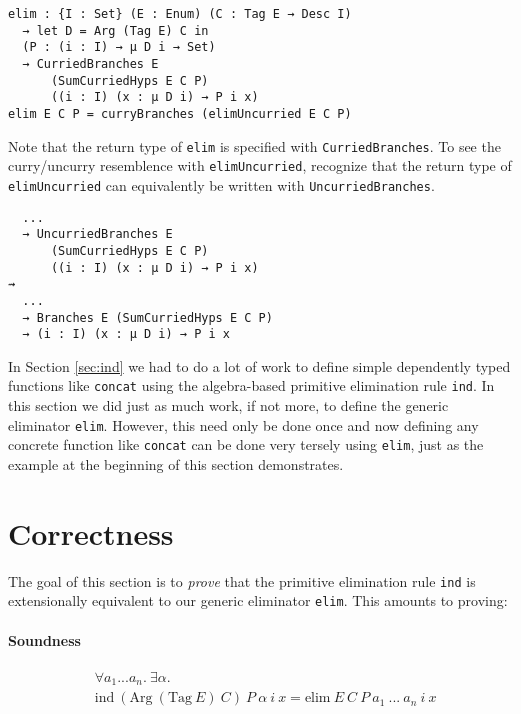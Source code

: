 \documentclass[preprint,nonatbib]{sigplanconf}
\newcommand{\refsec}[1]{Section \ref{sec:#1}}
\begin{document}
\begin{verbatim}
elim : {I : Set} (E : Enum) (C : Tag E → Desc I)
  → let D = Arg (Tag E) C in
  (P : (i : I) → μ D i → Set)
  → CurriedBranches E
      (SumCurriedHyps E C P)
      ((i : I) (x : μ D i) → P i x)
elim E C P = curryBranches (elimUncurried E C P)
\end{verbatim}

Note that the return type of {\tt elim} is specified with
\linebreak
{\tt CurriedBranches}. To see the curry/uncurry resemblence with
{\tt elimUncurried}, recognize that the return type of
{\tt elimUncurried} can equivalently be written with
{\tt UncurriedBranches}.

\begin{verbatim}
  ...
  → UncurriedBranches E
      (SumCurriedHyps E C P)
      ((i : I) (x : μ D i) → P i x)
⇝
  ...
  → Branches E (SumCurriedHyps E C P)
  → (i : I) (x : μ D i) → P i x
\end{verbatim}

In \refsec{ind} we had to do a lot of work to define simple dependently
typed functions like {\tt concat} using the algebra-based primitive
elimination rule {\tt ind}. In this section we did just as much work,
if not more, to define the generic eliminator {\tt elim}. However,
this need only be done once and now defining any concrete function
like {\tt concat} can be done very tersely using {\tt elim}, just as
the example at the beginning of this section demonstrates.

\section{Correctness}
\label{sec:correctness}

The goal of this section is to {\it prove} that the primitive
elimination rule {\tt ind} is extensionally equivalent to our
generic eliminator {\tt elim}. This amounts to proving:

\paragraph{Soundness}

\begin{align*}
&\forall a_1 ... a_n. ~ \exists \alpha. \\
&\textrm{ind} ~ (\textrm{Arg} ~ (\textrm{Tag} ~ E) ~ C) ~ P ~ \alpha ~ i ~ x =
\textrm{elim} ~ E ~ C ~ P ~ a_1 ~ ... ~ a_n ~ i ~ x
\end{align*}
\end{document}
